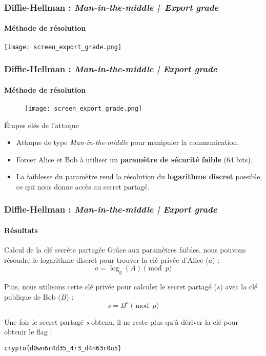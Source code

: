 \begin{frame}
    \frametitle{Diffie-Hellman : \textit{Man-in-the-middle | Export grade}}
    \framesubtitle{Méthode de résolution}
    \begin{center}
        \texttt{[image: screen\_export\_grade.png]}
        \vspace{0.5em}
    \end{center}
\end{frame}

\begin{frame}
    \frametitle{Diffie-Hellman : \textit{Man-in-the-middle | Export grade}}
    \framesubtitle{Méthode de résolution}

    \begin{figure}
        \centering
        \texttt{[image: screen\_export\_grade.png]}
    \end{figure}

    \begin{block}{Étapes clés de l'attaque}
        \begin{itemize}
            \item Attaque de type \textit{Man-in-the-middle} pour manipuler la communication.
            \item Forcer Alice et Bob à utiliser un \textbf{paramètre de sécurité faible} (64 bits).
            \item La faiblesse du paramètre rend la résolution du \textbf{logarithme discret} possible, ce qui nous donne accès au secret partagé.
        \end{itemize}
    \end{block}
    
\end{frame}


\begin{frame}
    \frametitle{Diffie-Hellman : \textit{Man-in-the-middle | Export grade}}
    \framesubtitle{Résultats}

    \begin{block}{Calcul de la clé secrète partagée}
        Grâce aux paramètres faibles, nous pouvons résoudre le logarithme discret pour trouver la clé privée d'Alice ($a$) :
        $$ a = \log_g(A) \pmod{p} $$
        
        Puis, nous utilisons cette clé privée pour calculer le secret partagé ($s$) avec la clé publique de Bob ($B$) :
        $$ s = B^a \pmod{p} $$
    \end{block}
    
    \vspace{1em}
    
    Une fois le secret partagé \textit{s} obtenu, il ne reste plus qu'à dériver la clé pour obtenir le flag : 

        \begin{center}
            \Large\texttt{crypto\{d0wn6r4d35\_4r3\_d4n63r0u5\}}
        \end{center}

\end{frame}